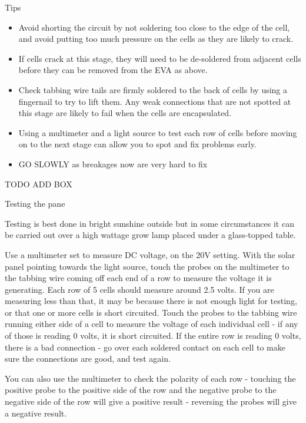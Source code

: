 \documentclass{article}
\theoremstyle{definition}
\theoremstyle{definition}
\theoremstyle{remark}
\begin{document}
    Tips

    \begin{itemize}
      \item Avoid shorting the circuit by not soldering too close to the edge of the cell, and avoid putting too much pressure on the cells as they are likely to crack. 
      \item If cells crack at this stage, they will need to be de-soldered from adjacent cells before they can be removed from the EVA as above.
      \item Check tabbing wire tails are firmly soldered to the back of cells by using a fingernail to try to lift them. Any weak connections that are not spotted at this stage are likely to fail when the cells are encapsulated.
      \item Using a multimeter and a light source to test each row of cells before moving on to the next stage can allow you to spot and fix problems early.
      \item GO SLOWLY as breakages now are very hard to fix
    \end{itemize}

    TODO ADD BOX

    Testing the pane

    Testing is best done in bright sunshine outside but in some circumstances it can be carried out over a high wattage grow lamp placed under a glass-topped table. 

    Use a multimeter set to measure DC voltage, on the 20V setting. With the solar panel pointing towards the light source, touch the probes on the multimeter to the tabbing wire coming off each end of a row to measure the voltage it is generating. Each row of 5 cells should measure around 2.5 volts. If you are measuring less than that, it may be because there is not enough light for testing, or that one or more cells is short circuited. Touch the probes to the tabbing wire running either side of a cell to measure the voltage of each individual cell - if any of those is reading 0 volts, it is short circuited. If the entire row is reading 0 volts, there is a bad connection - go over each soldered contact on each cell to make sure the connections are good, and test again.

    You can also use the multimeter to check the polarity of each row - touching the positive probe to the positive side of the row and the negative probe to the negative side of the row will give a positive result - reversing the probes will give a negative result.
  
\end{document}
